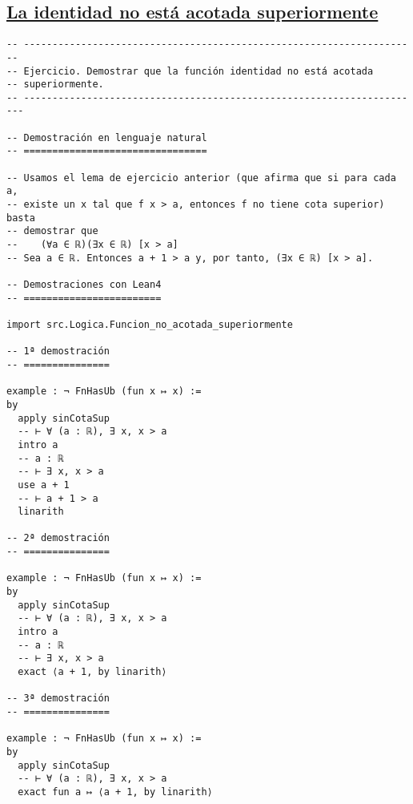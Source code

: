 \subsection{\href{./src/Logica/La\_identidad\_no\_esta\_acotada\_superiormente.lean}{La identidad no está acotada superiormente}}
\label{sec:org6dcfdf7}
\begin{verbatim}
-- ---------------------------------------------------------------------
-- Ejercicio. Demostrar que la función identidad no está acotada
-- superiormente.
-- ----------------------------------------------------------------------

-- Demostración en lenguaje natural
-- ================================

-- Usamos el lema de ejercicio anterior (que afirma que si para cada a,
-- existe un x tal que f x > a, entonces f no tiene cota superior) basta
-- demostrar que
--    (∀a ∈ ℝ)(∃x ∈ ℝ) [x > a]
-- Sea a ∈ ℝ. Entonces a + 1 > a y, por tanto, (∃x ∈ ℝ) [x > a].

-- Demostraciones con Lean4
-- ========================

import src.Logica.Funcion_no_acotada_superiormente

-- 1ª demostración
-- ===============

example : ¬ FnHasUb (fun x ↦ x) :=
by
  apply sinCotaSup
  -- ⊢ ∀ (a : ℝ), ∃ x, x > a
  intro a
  -- a : ℝ
  -- ⊢ ∃ x, x > a
  use a + 1
  -- ⊢ a + 1 > a
  linarith

-- 2ª demostración
-- ===============

example : ¬ FnHasUb (fun x ↦ x) :=
by
  apply sinCotaSup
  -- ⊢ ∀ (a : ℝ), ∃ x, x > a
  intro a
  -- a : ℝ
  -- ⊢ ∃ x, x > a
  exact ⟨a + 1, by linarith⟩

-- 3ª demostración
-- ===============

example : ¬ FnHasUb (fun x ↦ x) :=
by
  apply sinCotaSup
  -- ⊢ ∀ (a : ℝ), ∃ x, x > a
  exact fun a ↦ ⟨a + 1, by linarith⟩
\end{verbatim}

